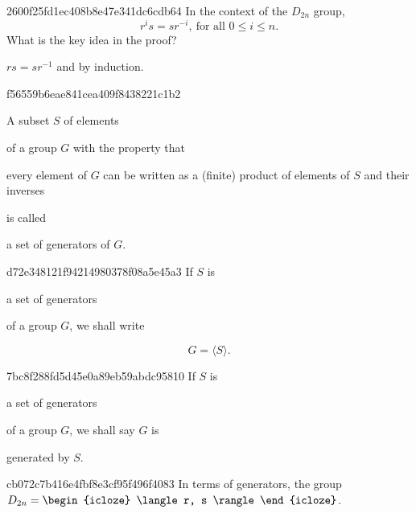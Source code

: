 \begin{note}{2600f25fd1ec408b8e47e341dc6cdb64}
    In the context of the \({ D_{2n} }\) group,
    \[
        r^{i}s = s r^{-i},\ \text{for all \({ 0 \leq i \leq n }\)}.
    \]
    What is the key idea in the proof?

    \begin{cloze}{1}
        \({ rs = s r^{-1} }\) and by induction.
    \end{cloze}
\end{note}

\begin{note}{f56559b6eae841cea409f8438221c1b2}
    \begin{icloze}{3}A subset \({ S }\) of elements\end{icloze} of a group \({ G }\) with the property that \begin{icloze}{1}every element of \({ G }\) can be written as a (finite) product of elements of \({ S }\) and their inverses\end{icloze} is called \begin{icloze}{2}a set of generators of \({ G }\).\end{icloze}
\end{note}

\begin{note}{d72e348121f94214980378f08a5e45a3}
    If \({ S }\) is \begin{icloze}{2}a set of generators\end{icloze} of a group \({ G }\), we shall write
    \begin{icloze}{1}
        \[
            G = \langle S \rangle.
        \]
    \end{icloze}
\end{note}

\begin{note}{7bc8f288fd5d45e0a89eb59abdc95810}
    If \({ S }\) is \begin{icloze}{2}a set of generators\end{icloze} of a group \({ G }\), we shall say \({ G }\) is \begin{icloze}{1}generated by \({ S }\).\end{icloze}
\end{note}

\begin{note}{cb072c7b416e4fbf8e3cf95f496f4083}
    In terms of generators, the group \({ D_{2n} = \begin{icloze}{1}\langle r, s \rangle\end{icloze} }\).
\end{note}

